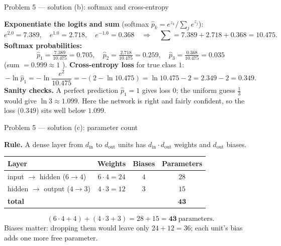 \documentclass[aspectratio=169,11pt]{beamer}
\begin{document}
\begin{frame}{Problem 5 --- solution (b): softmax and cross-entropy}
  \begin{solutionbox}
    \textbf{Exponentiate the logits and sum} (softmax $\hat p_k=e^{z_k}/\sum_j e^{z_j}$):
    \[
      e^{2.0}=7.389,\quad e^{1.0}=2.718,\quad e^{-1.0}=0.368
      \quad\Rightarrow\quad \textstyle\sum=7.389+2.718+0.368=10.475.
    \]
    \textbf{Softmax probabilities:}
    \[
      \hat p_1=\tfrac{7.389}{10.475}=\mathbf{0.705},\quad
      \hat p_2=\tfrac{2.718}{10.475}=\mathbf{0.259},\quad
      \hat p_3=\tfrac{0.368}{10.475}=\mathbf{0.035}
    \]
    (sum $=0.999\approx1$ \checkmark). \textbf{Cross-entropy loss} for true class $1$:
    \[
      -\ln\hat p_1=-\ln\frac{e^{2}}{10.475}=-(2-\ln 10.475)=\ln 10.475-2=2.349-2=\mathbf{0.349}.
    \]
    \textbf{Sanity checks.} A perfect prediction $\hat p_1=1$ gives loss $0$; the uniform guess
    $\tfrac13$ would give $\ln 3\approx1.099$. Here the network is right and fairly confident, so the
    loss ($0.349$) sits well below $1.099$.
  \end{solutionbox}
\end{frame}

\begin{frame}{Problem 5 --- solution (c): parameter count}
  \begin{solutionbox}
    \textbf{Rule.} A dense layer from $d_{\text{in}}$ to $d_{\text{out}}$ units has
    $d_{\text{in}}\cdot d_{\text{out}}$ weights and $d_{\text{out}}$ biases.
    \begin{center}
    \begin{tabular}{@{}lccc@{}}
      \toprule
      Layer & Weights & Biases & Parameters\\
      \midrule
      input $\to$ hidden ($6\to4$)  & $6\cdot4=24$ & $4$ & $28$\\
      hidden $\to$ output ($4\to3$) & $4\cdot3=12$ & $3$ & $15$\\
      \midrule
      \textbf{total} & & & $\mathbf{43}$\\
      \bottomrule
    \end{tabular}
    \end{center}
    \[
      (6\cdot4+4)+(4\cdot3+3)=28+15=\mathbf{43}\ \text{parameters.}
    \]
    Biases matter: dropping them would leave only $24+12=36$; each unit's bias adds one more free
    parameter.
  \end{solutionbox}
\end{frame}
\end{document}

